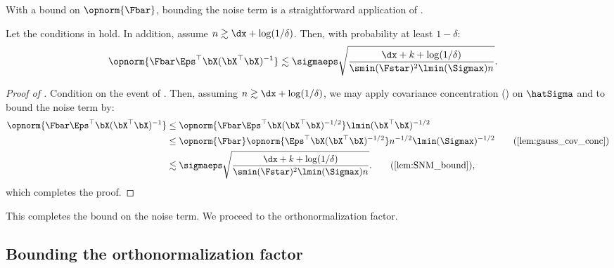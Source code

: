 With a bound on $\opnorm{\Fbar}$, bounding the noise term is a straightforward application of .
\begin{proposition}\label{prop:KFAC_noise_bound}
    Let the conditions in  hold. In addition, assume $n \gtrsim \dx + \log(1/\delta)$. Then, with probability at least $1-\delta$:
    \begin{align*}
        \opnorm{\Fbar \Eps^\top \bX (\bX^\top \bX)^{-1}}
        &\lesssim \sigmaeps  \sqrt{\frac{\dx + k + \log(1/\delta)}{\smin(\Fstar)^2\lmin(\Sigmax) n}}.
    \end{align*}
\end{proposition}


\begin{proof}[Proof of ]
    Condition on the event of . Then, assuming $n \gtrsim \dx + \log(1/\delta)$, we may apply covariance concentration () on $\hatSigma$ and  to bound the noise term by:
    \begin{align*}
        \opnorm{\Fbar \Eps^\top \bX (\bX^\top \bX)^{-1}} &\leq \opnorm{\Fbar \Eps^\top \bX (\bX^\top \bX)^{-1/2}} \lmin(\bX^\top \bX)^{-1/2} \\
        &\leq \opnorm{\Fbar}\opnorm{\Eps^\top \bX (\bX^\top \bX)^{-1/2}} n^{-1/2} \lmin(\Sigmax)^{-1/2} \tag{\Cref{lem:gauss_cov_conc}}\\
        &\lesssim \sigmaeps  \sqrt{\frac{\dx + k + \log(1/\delta)}{\smin(\Fstar)^2\lmin(\Sigmax) n}}. \tag{\Cref{lem:SNM_bound}},
    \end{align*}
    which completes the proof.
\end{proof}
This completes the bound on the noise term. We proceed to the orthonormalization factor.

\subsection*{Bounding the orthonormalization factor}

